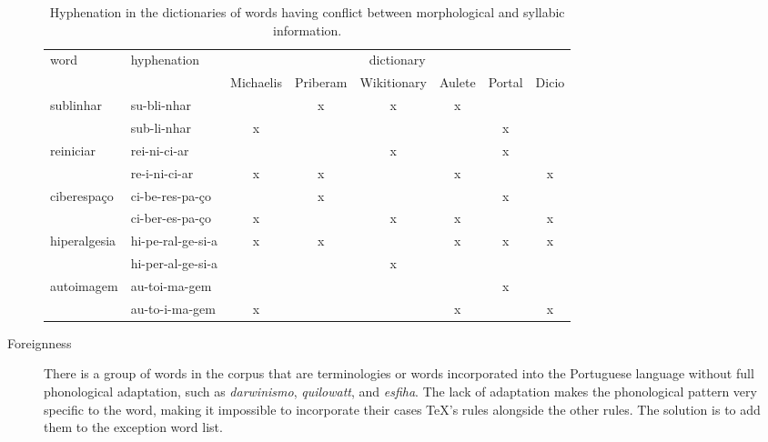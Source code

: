 \begin{description}
	\begin{table}
	\centering
	\scriptsize
	\caption{Hyphenation in the dictionaries of words having conflict between morphological and syllabic information.}
	\label{tab-mor-syl}
        \begin{tabular}{ll*{6}{c}}
	\toprule
	    word                      & hyphenation       & \multicolumn{6}{c}{dictionary} \\
             &                                            & Michaelis & Priberam & Wikitionary & Aulete & Portal & Dicio \\
	\midrule
        \multirow{2}{*}{sublinhar}    & su-bli-nhar       &           & x        & x           & x      &        &       \\
				      & sub-li-nhar       & x         &          &             &        & x      &       \\
	\midrule
	\multirow{2}{*}{reiniciar}    & rei-ni-ci-ar      &           &          & x           &        & x      &       \\
				      & re-i-ni-ci-ar     & x         & x        &             & x      &        & x     \\
	\midrule
	\multirow{2}{*}{ciberespaço}  & ci-be-res-pa-ço   &           & x        &             &        & x      &       \\
				      & ci-ber-es-pa-ço   & x         &          & x           & x      &        & x     \\
	\midrule
	\multirow{2}{*}{hiperalgesia} & hi-pe-ral-ge-si-a & x         & x        &             & x      & x      & x     \\
				      & hi-per-al-ge-si-a &           &          & x           &        &        &       \\
	\midrule
	\multirow{2}{*}{autoimagem}   & au-toi-ma-gem     &           &          &             &        & x      &       \\
				      & au-to-i-ma-gem    & x         &          &             & x      &        & x     \\
	\bottomrule
	\end{tabular}
	\end{table}

    \item [Foreignness\label{foreignness}] There is a group of words %
	in the corpus that are terminologies or words incorporated into the 
	Portuguese language without full phonological adaptation, such as 
	\emph{darwinismo}, \emph{quilowatt}, and \emph{esfiha}. The lack of
	adaptation makes the phonological pattern very specific to the word,
	making it impossible to incorporate their cases \TeX{}'s rules alongside the
	other rules. The solution is to add them to the exception word list.


\end{description}
